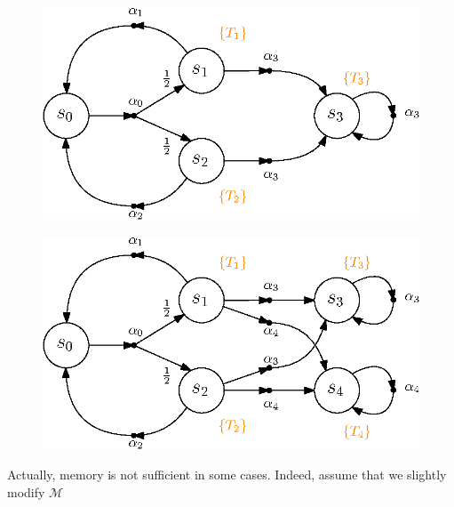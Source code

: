 \begin{figure}[h]
  \vspace{-.05\linewidth}
  \begin{minipage}{0.5\linewidth}
    \centering
    \includegraphics[width=0.9\linewidth]{resources/MDP-memory}
    \captionsetup{justification=centering}
    \label{MDP-memory-1}
  \end{minipage}
  \begin{minipage}{0.5\linewidth}
    \centering
    \vspace{.12\linewidth}
    \includegraphics[width=0.9\linewidth]{resources/MDP-memory-2}
    \captionsetup{justification=centering}
    \label{MDP-memory-2}
  \end{minipage}
\end{figure}
Actually, memory is not sufficient in some cases.
Indeed, assume that we slightly modify $\mathcal{M}$
